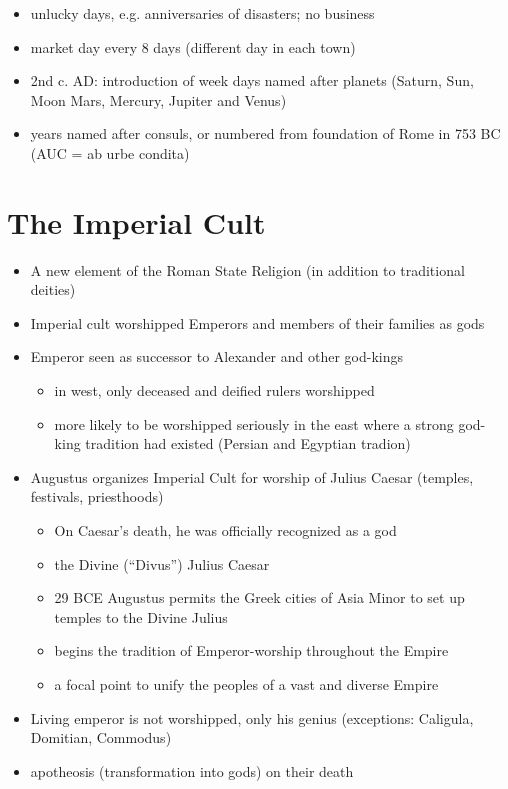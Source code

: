 \documentclass[12pt, twoside]{article}
\begin{document}
\begin{itemize}
\item unlucky days, e.g. anniversaries of disasters; no business
\item market day every 8 days (different day in each town)
\item 2nd c. AD: introduction of week days named after planets (Saturn, Sun, Moon Mars, Mercury, Jupiter and Venus)
\item years named after consuls, or numbered from foundation of Rome in 753 BC (AUC = ab urbe condita)
\end{itemize}

\section{The Imperial Cult}
\begin{itemize}
\item A new element of the Roman State Religion (in addition to traditional deities)
\item Imperial cult worshipped Emperors and members of their families as gods
\item Emperor seen as successor to Alexander and other god-kings
	\begin{itemize}
	\item in west, only deceased and deified rulers worshipped
	\item more likely to be worshipped seriously in the east where a strong god-king tradition had existed (Persian and Egyptian tradion)
	\end{itemize}
\item Augustus organizes Imperial Cult for worship of Julius Caesar (temples, festivals, priesthoods)
	\begin{itemize}
	\item On Caesar’s death, he was officially recognized as a god
	\item the Divine (“Divus”) Julius Caesar
	\item 29 BCE Augustus permits the Greek cities of Asia Minor to set up temples to the Divine Julius
	\item begins the tradition of Emperor-worship throughout the Empire
	\item a focal point to unify the peoples of a vast and diverse Empire
	\end{itemize}
\item Living emperor is not worshipped, only his genius (exceptions: Caligula, Domitian, Commodus)
\item apotheosis (transformation into gods) on their death

\end{itemize}
\end{document}
